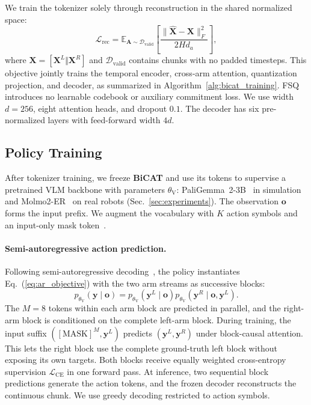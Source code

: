 We train the tokenizer solely through reconstruction in the shared normalized
space:
\begin{equation}
    \mathcal{L}_{\mathrm{rec}}
    =\mathbb{E}_{\mathbf{A}\sim\mathcal{D}_{\mathrm{valid}}}
    \left[\frac{\|\widehat{\mathbf{X}}-\mathbf{X}\|_{F}^{2}}
    {2Hd_a}\right],
    \label{eq:bicat_tokenizer_loss}
\end{equation}
where $\mathbf{X}=[\mathbf{X}^{L}\Vert\mathbf{X}^{R}]$ and
$\mathcal{D}_{\mathrm{valid}}$ contains chunks with no padded timesteps.
This objective jointly trains the temporal encoder, cross-arm attention,
quantization projection, and decoder, as summarized in
Algorithm~\ref{alg:bicat_training}. FSQ introduces no learnable codebook
or auxiliary commitment loss. We use width $d=256$, eight attention heads,
and dropout $0.1$. The decoder has six pre-normalized layers with feed-forward
width $4d$.

\subsection{Policy Training}
\label{sec:bicat_policy}

After tokenizer training, we freeze \textbf{BiCAT} and use its tokens to
supervise a pretrained VLM backbone with parameters $\theta_{\mathrm{V}}$:
PaliGemma~2-3B~\cite{steiner2024paligemma2} in simulation and
Molmo2-ER~\cite{fang2026molmoact2} on real robots (Sec.~\ref{sec:experiments}). The observation $\mathbf{o}$ forms the input prefix. We augment the vocabulary
with $K$ action symbols and an input-only mask token~\cite{chang2022maskgit}.

\paragraph{Semi-autoregressive action prediction.}
Following semi-autoregressive decoding~\cite{wang2018semiautoregressive},
the policy instantiates Eq.~(\ref{eq:ar_objective}) with the two arm streams
as successive blocks:
\begin{equation}
    p_{\theta_{\mathrm{V}}}(\mathbf{y}\mid\mathbf{o})
    =p_{\theta_{\mathrm{V}}}(\mathbf{y}^{L}\mid\mathbf{o})
    p_{\theta_{\mathrm{V}}}(\mathbf{y}^{R}\mid\mathbf{o},\mathbf{y}^{L}).
    \label{eq:bicat_bar}
\end{equation}
The $M=8$ tokens within each arm block are predicted in parallel, and the
right-arm block is conditioned on the complete left-arm block.
During training, the input suffix
$([\mathrm{MASK}]^{M},\mathbf{y}^{L})$ predicts
$(\mathbf{y}^{L},\mathbf{y}^{R})$ under block-causal attention. This lets the
right block use the complete ground-truth left block without exposing its
own targets. Both blocks receive equally weighted cross-entropy supervision
$\mathcal{L}_{\mathrm{CE}}$ in one forward pass. At inference, two sequential
block predictions generate the action tokens, and the frozen decoder
reconstructs the continuous chunk. We use greedy decoding restricted to
action symbols.
